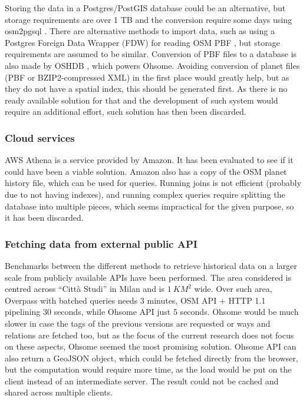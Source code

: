 \documentclass{Configuration_Files/PoliMi3i_thesis}
\begin{document}
Storing the data in a Postgres/PostGIS database could be an alternative, but storage requirements are over 1 TB and the conversion require some days using osm2pgsql \cite{Osm2pgsqlBenchmarksOpenStreetMap}.
There are alternative methods to import data, such as using a Postgres Foreign Data Wrapper (FDW) for reading OSM PBF \cite{pikulikOSMPBFForeign2022}, but storage requirements are assumed to be similar. 
Conversion of PBF files to a database is also made by OSHDB \cite{raiferOSHDBOpenStreetMapHistory2021}, which powers Ohsome.
Avoiding conversion of planet files (PBF or BZIP2-compressed XML) in the first place would greatly help, but as they do not have a spatial index, this should be generated first. As there is no ready available solution for that and the development of such system would require an additional effort, such solution has then been discarded.

\subsubsection{Cloud services}

AWS Athena \cite{AmazonAthenaServerless} is a service provided by Amazon. It has been evaluated to see if it could have been a viable solution. Amazon also has a copy of the OSM planet history file, which can be used for queries. Running joins is not efficient (probably due to not having indexes), and running complex queries require splitting the database into multiple pieces, which seems impractical for the given purpose, so it has been discarded.

\subsubsection{Fetching data from external public API}

Benchmarks between the different methods to retrieve historical data on a larger scale from publicly available APIs have been performed. The area considered is centred across “Città Studi” in Milan and is $ \SI{1}{KM^2} $ wide.
Over such area, Overpass with batched queries needs 3 minutes, OSM API + HTTP 1.1 pipelining 30 seconds, while Ohsome API just 5 seconds. Ohsome would be much slower in case the tags of the previous versions are requested or ways and relations are fetched too, but as the focus of the current research does not focus on these aspects, Ohsome seemed the most promising solution. Ohsome API can also return a GeoJSON object, which could be fetched directly from the browser, but the computation would require more time, as the load would be put on the client instead of an intermediate server. The result could not be cached and shared across multiple clients.
\end{document}
